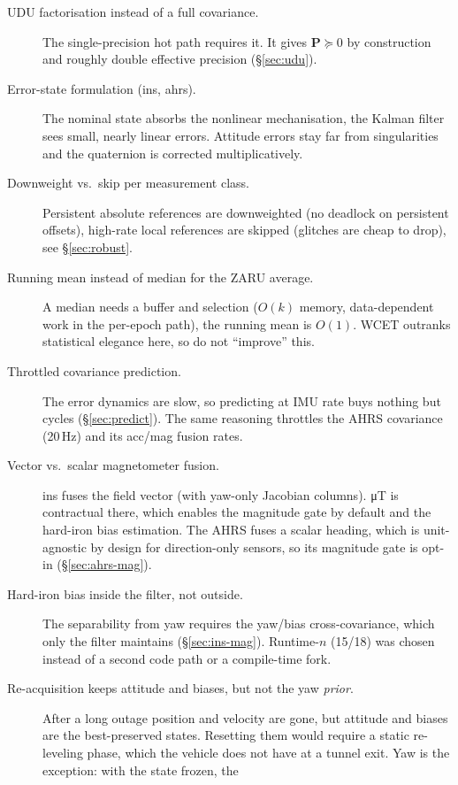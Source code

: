 \documentclass[11pt,a4paper]{article}
\newcommand{\mat}[1]{\bm{#1}}
\begin{document}
\begin{description}
  \item[UDU factorisation instead of a full covariance.]
    The single-precision hot path requires it. It gives $\mat{P} \succeq 0$ by
    construction and roughly double effective precision
    (\S\ref{sec:udu}).
  \item[Error-state formulation (ins, ahrs).] The nominal state
    absorbs the nonlinear mechanisation, the Kalman filter sees small,
    nearly linear errors. Attitude errors stay far from singularities
    and the quaternion is corrected multiplicatively.
  \item[Downweight vs.\ skip per measurement class.] Persistent
    absolute references are downweighted (no deadlock on persistent
    offsets), high-rate local references are skipped (glitches are
    cheap to drop), see \S\ref{sec:robust}.
  \item[Running mean instead of median for the ZARU average.] A median
    needs a buffer and selection ($O(k)$ memory, data-dependent work in
    the per-epoch path), the running mean is $O(1)$. WCET outranks
    statistical elegance here, so do not ``improve'' this.
  \item[Throttled covariance prediction.] The error dynamics are slow, so
    predicting at IMU rate buys nothing but cycles
    (\S\ref{sec:predict}). The same reasoning throttles the AHRS covariance
    (20\,Hz) and its acc/mag fusion rates.
  \item[Vector vs.\ scalar magnetometer fusion.] ins fuses the field
    vector (with yaw-only Jacobian columns). \si{\micro\tesla} is
    contractual there, which enables the magnitude gate by default and the
    hard-iron bias estimation. The AHRS fuses a scalar heading, which is
    unit-agnostic by design for direction-only sensors, so its magnitude gate
    is opt-in (\S\ref{sec:ahrs-mag}).
  \item[Hard-iron bias inside the filter, not outside.] The separability
    from yaw requires the yaw/bias cross-covariance, which only the
    filter maintains (\S\ref{sec:ins-mag}). Runtime-$n$ (15/18) was chosen
    instead of a second code path or a compile-time fork.
  \item[Re-acquisition keeps attitude and biases, but not the yaw
    \emph{prior}.] After a long outage position and velocity are gone, but
    attitude and biases are the best-preserved states. Resetting them would
    require a static re-leveling phase, which the vehicle does not have at a
    tunnel exit. Yaw is the exception: with the state frozen, the

\end{description}
\end{document}
